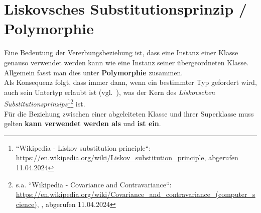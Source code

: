 \section{Liskovsches Substitutionsprinzip / Polymorphie}

\begin{tcolorbox}[title=Liskovsches Substitutionsprinzip / Polymorphie]
Eine Bedeutung der Vererbungsbeziehung ist, dass eine Instanz einer Klasse genauso verwendet werden kann wie eine Instanz seiner übergeordneten Klasse.\\
Allgemein fasst man dies unter \textbf{Polymorphie} zusammen.\\
Als Konsequenz folgt, dass immer dann, wenn ein bestimmter Typ gefordert wird, auch sein Untertyp erlaubt ist (vgl.~\cite[466]{Ull23}), was der Kern des \textit{Liskovschen Substitutionsprinzips}\footnote{
    ``Wikipedia - Liskov substitution principle``: \url{https://en.wikipedia.org/wiki/Liskov_substitution_principle}, abgerufen 11.04.2024
}\footnote{
    s.a. ``Wikipedia - Covariance and Contravariance``: \url{https://en.wikipedia.org/wiki/Covariance_and_contravariance_(computer_science)}, , abgerufen 11.04.2024
} ist.\\

\noindent
Für die Beziehung zwischen einer abgeleiteten Klasse und ihrer Superklasse muss gelten \textbf{kann verwendet werden als} und \textbf{ist ein}.
\end{tcolorbox}
